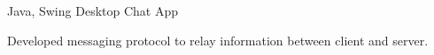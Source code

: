 

\begin{cventries}

  \cventry
  {Java, Swing} %
  {Desktop Chat App} %
  {} %
  {} %
  {
    \begin{cvitems}
      \item {Developed messaging protocol to relay information between client and server.}
    \end{cvitems}
  }

\end{cventries}
